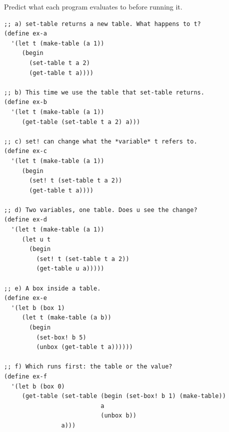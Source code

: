 \begin{exercise}
Predict what each program evaluates to before running it.
\begin{lstlisting}
;; a) set-table returns a new table. What happens to t?
(define ex-a
  '(let t (make-table (a 1))
     (begin
       (set-table t a 2)
       (get-table t a))))

;; b) This time we use the table that set-table returns.
(define ex-b
  '(let t (make-table (a 1))
     (get-table (set-table t a 2) a)))

;; c) set! can change what the *variable* t refers to.
(define ex-c
  '(let t (make-table (a 1))
     (begin
       (set! t (set-table t a 2))
       (get-table t a))))

;; d) Two variables, one table. Does u see the change?
(define ex-d
  '(let t (make-table (a 1))
     (let u t
       (begin
         (set! t (set-table t a 2))
         (get-table u a)))))

;; e) A box inside a table.
(define ex-e
  '(let b (box 1)
     (let t (make-table (a b))
       (begin
         (set-box! b 5)
         (unbox (get-table t a))))))

;; f) Which runs first: the table or the value?
(define ex-f
  '(let b (box 0)
     (get-table (set-table (begin (set-box! b 1) (make-table))
                           a
                           (unbox b))
                a)))
\end{lstlisting}
\end{exercise}
